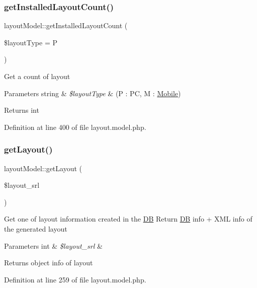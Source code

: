 \subsubsection{\texorpdfstring{get\+Installed\+Layout\+Count()}{getInstalledLayoutCount()}}
{\footnotesize\ttfamily layout\+Model\+::get\+Installed\+Layout\+Count (\begin{DoxyParamCaption}\item[{}]{\$layout\+Type = {\ttfamily \textquotesingle{}P\textquotesingle{}} }\end{DoxyParamCaption})}

Get a count of layout 
\begin{DoxyParams}[1]{Parameters}
string & {\em \$layout\+Type} & (P \+: PC, M \+: \hyperlink{classMobile}{Mobile}) \\
\hline
\end{DoxyParams}
\begin{DoxyReturn}{Returns}
int 
\end{DoxyReturn}


Definition at line 400 of file layout.\+model.\+php.

\hypertarget{classlayoutModel_a46f845328e6b65e772408ceb990adb6b}{}\label{classlayoutModel_a46f845328e6b65e772408ceb990adb6b} 
\subsubsection{\texorpdfstring{get\+Layout()}{getLayout()}}
{\footnotesize\ttfamily layout\+Model\+::get\+Layout (\begin{DoxyParamCaption}\item[{}]{\$layout\+\_\+srl }\end{DoxyParamCaption})}

Get one of layout information created in the \hyperlink{classDB}{DB} Return \hyperlink{classDB}{DB} info + X\+ML info of the generated layout 
\begin{DoxyParams}[1]{Parameters}
int & {\em \$layout\+\_\+srl} & \\
\hline
\end{DoxyParams}
\begin{DoxyReturn}{Returns}
object info of layout 
\end{DoxyReturn}


Definition at line 259 of file layout.\+model.\+php.

\hypertarget{classlayoutModel_afdd4cdf78d44f0a042522112818ddf11}{}\label{classlayoutModel_afdd4cdf78d44f0a042522112818ddf11} 

